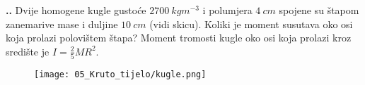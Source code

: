 
\noindent 
\textbf{
\thecjelina.\thezadatak.}
Dvije homogene kugle gustoće $2700\ kgm^{-3}$ i polumjera $4\ cm$ spojene su štapom zanemarive mase i duljine $10\ cm$ (vidi skicu).
Koliki je moment susutava oko osi koja prolazi polovištem štapa? Moment tromosti kugle oko osi koja prolazi kroz središte je $I=\frac{2}{5}MR^2$.
\begin{figure}[h]%
  \begin{center}
    \texttt{[image: 05\_Kruto\_tijelo/kugle.png]}
  \end{center}
\end{figure}


